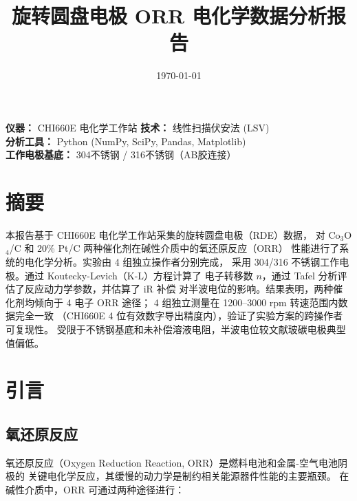 \documentclass[12pt,a4paper]{ctexart}
\title{\textbf{旋转圆盘电极 ORR 电化学数据分析报告}}
\author{}
\date{\today}
\begin{document}
\maketitle
\thispagestyle{empty}

\begin{center}
\small
\vspace{1cm}
\textbf{仪器：} CHI660E 电化学工作站 \quad
\textbf{技术：} 线性扫描伏安法 (LSV) \\
\textbf{分析工具：} Python (NumPy, SciPy, Pandas, Matplotlib)\\
\textbf{工作电极基底：} 304不锈钢 / 316不锈钢（AB胶连接）
\end{center}

\vspace{1.5cm}

\tableofcontents
\newpage

\section{摘要}

本报告基于 CHI660E 电化学工作站采集的旋转圆盘电极（RDE）数据，
对 Co$_3$O$_4$/C 和 20\% Pt/C 两种催化剂在碱性介质中的氧还原反应（ORR）
性能进行了系统的电化学分析。实验由 4 组独立操作者分别完成，
采用 304/316 不锈钢工作电极。通过 Koutecky-Levich（K-L）方程计算了
电子转移数 $n$，通过 Tafel 分析评估了反应动力学参数，并估算了 iR 补偿
对半波电位的影响。结果表明，两种催化剂均倾向于 4 电子 ORR 途径；
4 组独立测量在 1200--3000 rpm 转速范围内数据完全一致
（CHI660E 4 位有效数字导出精度内），验证了实验方案的跨操作者可复现性。
受限于不锈钢基底和未补偿溶液电阻，半波电位较文献玻碳电极典型值偏低。

\newpage

\section{引言}

\subsection{氧还原反应}

氧还原反应（Oxygen Reduction Reaction, ORR）是燃料电池和金属-空气电池阴极的
关键电化学反应，其缓慢的动力学是制约相关能源器件性能的主要瓶颈。
在碱性介质中，ORR 可通过两种途径进行\cite{spendelow2007}：
\end{document}

